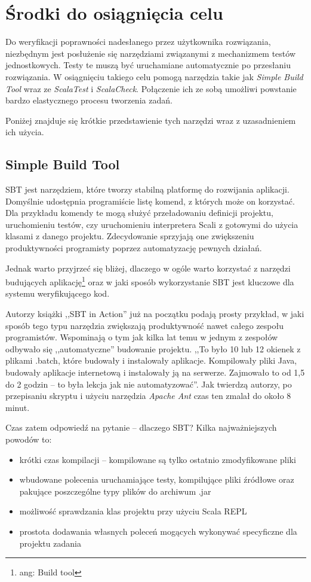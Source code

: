 \documentclass[brudnopis]{xmgr}
\begin{document}
\section{Środki do osiągnięcia celu}

Do weryfikacji poprawności nadesłanego przez użytkownika rozwiązania, niezbędnym jest posłużenie się narzędziami związanymi z mechanizmem testów jednostkowych. Testy te muszą być uruchamiane automatycznie po przesłaniu rozwiązania. W osiągnięciu takiego celu pomogą narzędzia takie jak \textit{Simple Build Tool} wraz ze \textit{ScalaTest} i \textit{ScalaCheck}. Połączenie ich ze sobą umożliwi powstanie bardzo elastycznego procesu tworzenia zadań. 

Poniżej znajduje się krótkie przedstawienie tych narzędzi wraz z uzasadnieniem ich użycia. 

\subsection{Simple Build Tool}

SBT jest narzędziem, które tworzy stabilną platformę do rozwijania aplikacji. Domyślnie udostępnia programiście listę komend, z których może on korzystać. Dla przykładu komendy te mogą służyć przeładowaniu definicji projektu, uruchomieniu testów, czy uruchomieniu interpretera Scali z gotowymi do użycia klasami z danego projektu. Zdecydowanie sprzyjają one zwiększeniu produktywności programisty poprzez automatyzację pewnych działań.

Jednak warto przyjrzeć się bliżej, dlaczego w ogóle warto korzystać z narzędzi budujących aplikację\footnote{ang: Build tool} oraz w jaki sposób wykorzystanie SBT jest kluczowe dla systemu weryfikującego kod. 

Autorzy książki ,,SBT in Action'' już na początku podają prosty przykład, w jaki sposób tego typu narzędzia zwiększają produktywność nawet całego zespołu programistów. Wspominają o tym jak kilka lat temu w jednym z zespołów odbywało się ,,automatyczne'' budowanie projektu. ,,To było 10 lub 12 okienek z plikami .batch, które budowały i instalowały aplikacje. Kompilowały pliki Java, budowały aplikacje internetową i instalowały ją na serwerze. Zajmowało to od 1,5 do 2 godzin -- to była lekcja jak nie automatyzować''. \cite[s.1]{Suereth:2014:SIA} Jak twierdzą autorzy, po przepisaniu skryptu i użyciu narzędzia \emph{Apache Ant} czas ten zmalał do około 8 minut.

Czas zatem odpowiedź na pytanie -- dlaczego SBT? Kilka najważniejszych powodów to:
\begin{itemize}
\item krótki czas kompilacji -- kompilowane są tylko ostatnio zmodyfikowane pliki
\item wbudowane polecenia uruchamiające testy, kompilujące pliki źródłowe oraz pakujące poszczególne typy plików do archiwum .jar
\item możliwość sprawdzania klas projektu przy użyciu Scala REPL
\item prostota dodawania własnych poleceń mogących wykonywać specyficzne dla projektu zadania   
\end{itemize}
\end{document}
